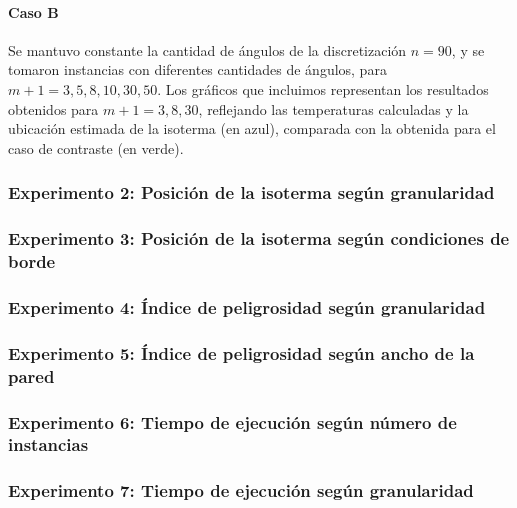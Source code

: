     \paragraph{Caso B} Se mantuvo constante la cantidad de ángulos de la discretización $n = 90$, y se tomaron instancias con diferentes cantidades de ángulos, para $m + 1 = 3, 5, 8, 10, 30, 50$. Los gráficos que incluimos representan los resultados obtenidos para $m + 1 = 3, 8, 30$, reflejando las temperaturas calculadas y la ubicación estimada de la isoterma (en azul), comparada con la obtenida para el caso de contraste (en verde).


  \subsubsection*{Experimento 2: Posición de la isoterma según granularidad}

  \subsubsection*{Experimento 3: Posición de la isoterma según condiciones de borde}

  \subsubsection*{Experimento 4: Índice de peligrosidad según granularidad}

  \subsubsection*{Experimento 5: Índice de peligrosidad según ancho de la pared}

  \subsubsection*{Experimento 6: Tiempo de ejecución según número de instancias}

  \subsubsection*{Experimento 7: Tiempo de ejecución según granularidad}


	
	
	


